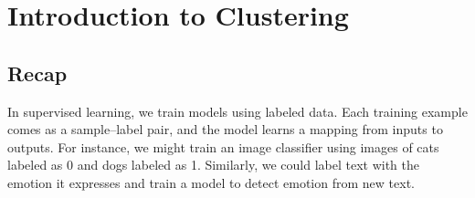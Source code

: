 \documentclass{article}
\begin{document}



\section{Introduction to Clustering}
\subsection{Recap}

In supervised learning, we train models using labeled data. Each training example comes as a sample–label pair, and the model learns a mapping from inputs to outputs. For instance, we might train an image classifier using images of cats labeled as 0 and dogs labeled as 1. Similarly, we could label text with the emotion it expresses and train a model to detect emotion from new text.
\end{document}
